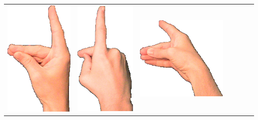\documentclass{article}
\begin{document}
\begin{center}
\begin{tabular}{r*{6}{c}}
\includegraphics[scale=0.1]{images/01-03-2.jpg}&
\includegraphics[scale=0.1]{images/01-03-3.jpg}&
\includegraphics[scale=0.1]{images/01-03-4.jpg}&

\end{tabular}
\end{center}
\end{document}
